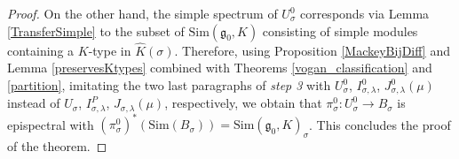 \documentclass{amsart}
\theoremstyle{definition}
\begin{document}
\begin{proof}
On the other hand, the simple spectrum of $U_\sigma^0$ corresponds via Lemma \ref{TransferSimple} to the subset of $\mathrm{Sim}(\mathfrak{g}_0,K)$ consisting of simple modules containing a $K$-type in $\widehat{K}(\sigma)$. Therefore, using Proposition \ref{MackeyBijDiff} and Lemma \ref{preservesKtypes} combined with Theorems \ref{vogan_classification} and \ref{partition}, imitating the two last paragraphs of \textit{step 3} with $U_\sigma^0$, $I^0_{\sigma,\lambda}$, $J^0_{\sigma,\lambda}(\mu)$ instead of $U_\sigma$, $I^P_{\sigma,\lambda}$, $J_{\sigma,\lambda}(\mu)$, respectively, we obtain that $\pi_\sigma^0 : U_\sigma^0 \to B_\sigma$ is epispectral with $(\pi_\sigma^0)^*(\mathrm{Sim}(B_\sigma)) = \mathrm{Sim}(\mathfrak{g}_0,K)_\sigma$. This concludes the proof of the theorem.
\end{proof}
\end{document}
